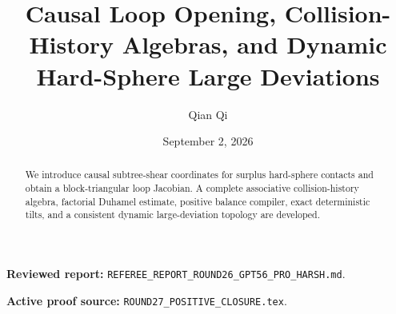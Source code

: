 \documentclass[11pt,reqno]{amsart}
\title[B2 Round 27 revision]{Causal Loop Opening, Collision-History Algebras, and Dynamic Hard-Sphere Large Deviations}
\author{Qian Qi}
\date{September 2, 2026}
\begin{document}
\begin{abstract}We introduce causal subtree-shear coordinates for surplus hard-sphere contacts and obtain a block-triangular loop Jacobian. A complete associative collision-history algebra, factorial Duhamel estimate, positive balance compiler, exact deterministic tilts, and a consistent dynamic large-deviation topology are developed.\end{abstract}
\maketitle
\noindent\textbf{Reviewed report:} \texttt{REFEREE\_REPORT\_ROUND26\_GPT56\_PRO\_HARSH.md}.\par
\noindent\textbf{Active proof source:} \texttt{ROUND27\_POSITIVE\_CLOSURE.tex}.\par

\end{document}
